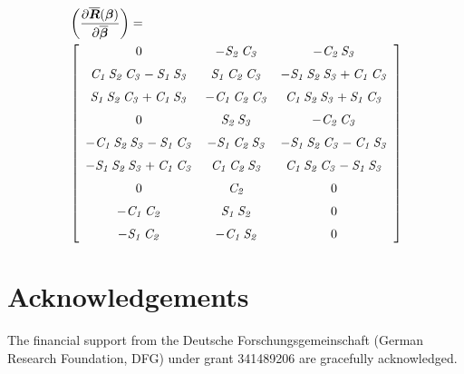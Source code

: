 \documentclass[twocolumn,10pt]{IFTOMM}
\newcommand{\bm}[1]{\boldsymbol{#1}}
\begin{document}
\begin{align}
&\left(\frac{\partial \overline{\bm{R}}(\bm{\beta})}{\partial \overline{\bm{\beta}}}\right)
=\\
\small
&\left[ \begin {array}{ccc} 0&-{\it S_2}\,{\it C_3}&-{\it C_2}\,{\it S_3}
\\ \noalign{\medskip}{\it C_1}\,{\it S_2}\,{\it C_3}-{\it S_1}\,{\it S_3}&{
 \it S_1}\,{\it C_2}\,{\it C_3}&-{\it S_1}\,{\it S_2}\,{\it S_3}+{\it C_1}\,{
 \it C_3}\\ \noalign{\medskip}{\it S_1}\,{\it S_2}\,{\it C_3}+{\it C_1}\,{
 \it S_3}&-{\it C_1}\,{\it C_2}\,{\it C_3}&{\it C_1}\,{\it S_2}\,{\it S_3}+{
 \it S_1}\,{\it C_3}\\ \noalign{\medskip}0&{\it S_2}\,{\it S_3}&-{\it C_2}\,
{\it C_3}\\ \noalign{\medskip}-{\it C_1}\,{\it S_2}\,{\it S_3}-{\it S_1}\,{
    \it C_3}&-{\it S_1}\,{\it C_2}\,{\it S_3}&-{\it S_1}\,{\it S_2}\,{\it C_3}-{
    \it C_1}\,{\it S_3}\\ \noalign{\medskip}-{\it S_1}\,{\it S_2}\,{\it S_3}+{
    \it C_1}\,{\it C_3}&{\it C_1}\,{\it C_2}\,{\it S_3}&{\it C_1}\,{\it S_2}\,{
    \it C_3}-{\it S_1}\,{\it S_3}\\ \noalign{\medskip}0&{\it C_2}&0
\\ \noalign{\medskip}-{\it C_1}\,{\it C_2}&{\it S_1}\,{\it S_2}&0
\\ \noalign{\medskip}-{\it S_1}\,{\it C_2}&-{\it C_1}\,{\it S_2}&0
\end {array} \right]  \nonumber
\end{align}

\section{Acknowledgements}

The financial support from the Deutsche Forschungsgemeinschaft (German Research Foundation, DFG) under grant 341489206 are gracefully acknowledged.



\end{document}
